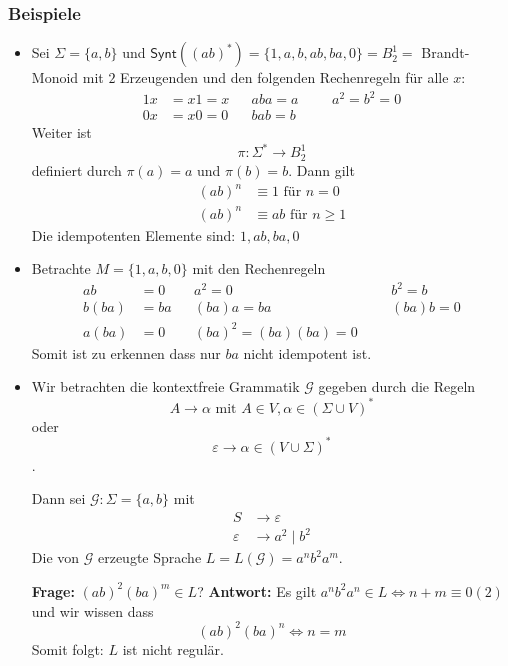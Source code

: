 \documentclass[12pt, german]{article}
\newcommand{\sigstern}{\Sigma^\ast}
\newcommand{\synt}{\mathsf{Synt}}
\begin{document}
\subsubsection{Beispiele} 
	\begin{itemize}
		\item Sei $\Sigma = \{a, b\}$ und $\synt((ab)^\ast) = \{1, a ,b , ab, ba, 0\} = B^1_2 =$ Brandt-Monoid mit $2$ Erzeugenden und den folgenden Rechenregeln für alle $x$: 
		\begin{align*}
			1x &= x1 = x   &&aba = a  &&&a^2=b^2 = 0\\
			0x &= x0 = 0   &&bab = b 
		\end{align*}
		Weiter ist $$\pi: \sigstern \to B^1_2$$ definiert durch $\pi(a) = a$ und $\pi(b) = b$. Dann gilt 
		\begin{align*}
			(ab)^n &\equiv 1 \text{ für } n = 0 \\
			(ab)^n &\equiv ab \text{ für } n \geq 1 
		\end{align*} Die idempotenten Elemente sind: $1, ab ,ba, 0$
		\item Betrachte $M = \{1, a, b, 0\}$ mit den Rechenregeln 
		\begin{align*}
			ab &= 0    && a^2 = 0 &&&b^2 = b \\
			b(ba) &= ba   &&(ba)a = ba &&& (ba)b = 0 \\
			a(ba) &= 0  &&(ba)^2 = (ba)(ba) = 0
		\end{align*}
		Somit ist zu erkennen dass nur $ba$ nicht idempotent ist. 
		\item Wir betrachten die kontextfreie Grammatik $\mathscr{G}$ gegeben durch die Regeln $$A \to \alpha \text{ mit } A \in V, \alpha \in (\Sigma \cup V)^\ast$$ oder $$\varepsilon \to \alpha \in (V \cup \Sigma)^\ast$$. 
		
		Dann sei $\mathscr{G}: \Sigma = \{a, b\}$ mit 
		\begin{align*}
			S &\to \varepsilon \\ 
			\varepsilon &\to a^2 \mid b^2 
		\end{align*} 
		Die von $\mathscr{G}$ erzeugte Sprache $L = L(\mathscr{G}) = a^nb^2a^m$. \\ 
		\newline
		
		\textbf{Frage:} $(ab)^2(ba)^m \in L$? 
		\newline
		\textbf{Antwort:} Es gilt $a^nb^2a^n \in L \iff n+m \equiv 0 (2)$ und wir wissen dass $$(ab)^2(ba)^n \iff n = m$$ Somit folgt: $L$ ist nicht regulär.
	\end{itemize}
	
\end{document}
